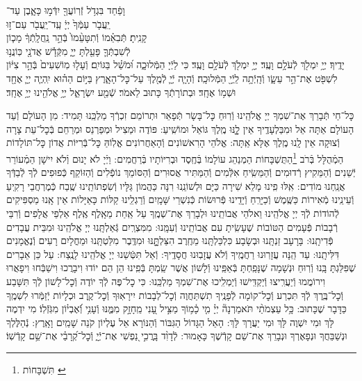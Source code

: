 \documentclass[twoside, openany, parskip=half, 11pt]{book}
\begin{document}
וָפַ֔חַד \hfill בִּגְדֹ֥ל זְֿרֽוֹעֲךָ֖ יִדְּֿמ֣וּ כָּאָ֑בֶן \hfill עַד־\\
יַֽעֲבֹ֤ר עַמְּֿךָ֙ יְיָ֔ \hfill עַֽד־יַֽעֲבֹ֖ר עַם־ז֣וּ \\
קָנִֽיתָ׃ \hfill תְּֿבִאֵ֗מוֹ וְֿתִטָּעֵ֨מוֹ֙ בְּֿהַ֣ר נַֽחֲלָֽתְֿךָ֔ \hfill מָכ֧וֹן \\
לְֿשִׁבְתְּֿךָ֛ פָּעַ֖לְתָּ יְיָ֑ \hfill מִקְּֿדָ֕שׁ אֲדֹנָ֖י כּֽוֹנֲנ֥וּ \\
יָדֶֽיךָ׃ \hfill יְיָ֥ יִמְלֹ֖ךְ לְֿעֹלָ֥ם וָעֶֽד׃\hfill \break
יְיָ֥ יִמְלֹ֖ךְ לְֿעֹלָ֥ם וָעֶֽד׃
כִּי לַיְֿיָ הַמְּֿלוּכָ֑ה וּ֝מֹשֵׁ֗ל בַּגּוֹיִֽם׃
וְֿעָל֤וּ מֽוֹשִׁעִים֙ בְּֿהַ֣ר צִיּ֔וֹן לִשְׁפֹּ֖ט אֶת־הַ֣ר עֵשָׂ֑ו וְֿהָֽיְֿתָ֥ה לַֽיְֿיָ֖ הַמְּֿלוּכָֽה׃
וְֿהָיָ֧ה יְֿיָ֛ לְֿמֶ֖לֶךְ עַל־כׇּל־הָאָ֑רֶץ בַּיּ֣וֹם הַה֗וּא יִֽהְיֶ֧ה יְיָ֛ אֶחָ֖ד וּשְׁמ֥וֹ אֶחָֽד׃
וּבְתוֹרָתְֿךָ כָּתוּב לֵאמֹר׃
שְֿׁמַ֖ע יִשְׂרָאֵ֑ל יְיָ֥ אֱלֹהֵ֖ינוּ יְיָ֥ אֶחָֽד׃

\enlargethispage{.5\baselineskip}
\label{nishmas}
כׇּל־חַי תְּֿבָרֵךְ אֶת־שִׁמְךָ יְיָ אֱלֹהֵֽינוּ וְֿרֽוּחַ כׇּל־בָּשָׂר תְּֿפָאֵר וּתְרוֹמֵם זִכְרְֿךָ מַלְכֵּֽנוּ תָּמִיד: מִן הָעוֹלָם וְֿעַד הָעוֹלָם אַתָּה אֵל וּמִבַּלְעָדֶֽיךָ אֵין לׇׇָֽנּוּ מֶֽלֶךְ גּוֹאֵל וּמוֹשִֽׁיעַ:
פּוֹדֶה וּמַצִיל וּמְפַרְנֵס וּמְרַחֵם בְּֿכׇל־עֵת צָרָה וְֿצוּקָה אֵין לָֽנוּ מֶֽלֶךְ אֶלָּא אַֽתָּה: אֱלֹהֵי הָרִאשׁוֹנִים וְֿהָאַחֲרוֹנִים אֱלֽוֹהַּ כׇּל־בְּֿרִיּוֹת אֲדוֹן כׇּל־תּוֹלָדוֹת הַמְֿהֻלָּל בְּֿרֹב \footnote{תִּשְׁבָּחוֹת \label{xx}}הַתֻּשְׁבָּחוֹת הַמְנַהֵג עוֹלָמוֹ בְּֿחֶֽסֶד וּבְרִיּוֹתָיו בְּֿרַחֲמִים: וַיְֿיָ לֹא יָנוּם וְֿלֹא יִישָׁן הַמְֿעוֹרֵר יְֿשֵׁנִים וְֿהַמֵּקִיץ רְֿדוּמִים וְֿהַמֵּשִֽׂיחַ אִלְּֿמִים וְֿהַמַּתִּיר אֲסוּרִים וְֿהַסּוֹמֵךְ נוֹפְֿלִים וְֿהַזּוֹקֵף כְּֿפוּפִים לְֿךָ לְֿבַדְּֿךָ אֲנַֽחְנוּ מוֹדִים: אִֽלּוּ פִֽינוּ מָלֵא שִׁירָה כַּיָּם וּלְשׁוֹנֵֽנוּ רִנָּה כַּהֲמוֹן גַּלָּיו וְֿשִׂפְתוֹתֵֽינוּ שֶֽׁבַח כְּֿמֶרְחֲבֵי רָקִֽיעַ וְֿעֵינֵֽינוּ מְֿאִירוֹת כַּשֶּֽׁמֶשׁ וְֿכַיָּרֵֽחַ וְֿיָדֵֽינוּ פְּֿרוּשׂוֹת כְּֿנִשְׁרֵי שָּׁמָֽיִם וְֿרַגְלֵֽינוּ קַלּוֹת כָּאַיָּלוֹת אֵין אָֽנוּ מַסְפִּיקִים לְֿהוֹדוֹת לְֿךָ יְיָ אֱלֹהֵֽינוּ וֵאלֹהֵי אֲבוֹתֵֽינוּ וּלְבָרֵךְ אֶת־שְׁמֶֽךָ עַל אַֽחַת מֵאָֽלֶף אֶֽלֶף אַלְפֵי אֲלָפִים וְֿרִבֵּי רְֿבָבוֹת פְּֿעָמִים הַטּוֹבוֹת שֶׁעָשִֽׂיתָ עִם אֲבוֹתֵֽינוּ וְֿעִמָּֽנוּ: מִמִּצְרַֽיִם גְּֿאַלְתָּֽנוּ יְיָ אֱלֹהֵֽינוּ וּמִבֵּית עֲבָדִים פְּֿדִיתָֽנוּ: בָּרָעָב זַנְתָּֽנוּ וּבְשָׂבָע כִּלְכַּלְתָּֽנוּ מֵחֶֽרֶב הִצַּלְתׇׇָּֽנּוּ וּמִדֶּֽבֶר מִלַּטְתָּֽנוּ וּמֵחֳלָיִם רָעִים וְֿנֶאֱמָנִים דִּלִּיתָֽנוּ: עַד הֵֽנָּה עֲזָרֽוּנוּ רַחֲמֶֽיךָ וְֿלֹא עֲזָבֽוּנוּ חֲסָדֶֽיךָ: וְֿאַל תִּטְּֿשֵׁנוּ יְיָ אֱלֹהֵֽינוּ לָנֶֽצַח: עַל כֵּן אֵבָרִים שֶׁפִּלַּגְתָּ בָּֽנוּ וְֿרֽוּחַ וּנְשָׁמָה שֶׁנָּפַֽחְתָּ בְּֿאַפֵּֽינוּ וְֿלָשׁוֹן אֲשֶׁר שַֽׂמְתָּ בְּֿפִֽינוּ הֵן הֵם יוֹדוּ וִיבָרֲכוּ וִישַׁבְּֿחוּ וִיפָאֲרוּ וִירוֹמֲמוּ וְֿיַעֲרִֽיצוּ וְֿיַקְדִּֽישׁוּ וְֿיַמְלִֽיכוּ אֶת־שִׁמְךָ מַלְכֵּֽנוּ: כִּי כׇל־פֶּה לְֿךָ יוֹדֶה וְֿכׇל־לָשׁוֹן לְֿךָ תִּשָּׁבַע וְֿכׇל־בֶּֽרֶךְ לְֿךָ תִּכְרַע וְֿכׇל־קוֹמָה לְֿפָנֶֽיךָ תִשְׁתַּחֲוֶה וְֿכׇל־לְבָבוֹת יִירָאֽוּךָ וְֿכׇל־קֶֽרֶב וּכְלָיוֹת יְֿזַמְּֿרוּ לִשְׁמֶֽךָ כַּדָּבָר שֶׁכָּתוּב:
כָּ֥ל עַצְמֹתַ֨י תֹּאמַרְנָה֘ יְיָ֗ מִ֤י כָ֫מ֥וֹךָ מַצִּ֣יל עָ֭נִי מֵֽחָזָ֣ק מִמֶּ֑נּוּ וְֿעָנִ֥י וְֿ֝אֶבְי֗וֹן מִגֹּֽזְֿלֽוֹ׃ מִי יִדְמֶה לָּךְ וּמִי יִשְׁוֶה לָּךְ וּמִי יַעֲרָךְ לָּךְ: הָאֵל הַגָּדוֹל הַגִּבּוֹר וְֿהַנּוֹרָא אֵל עֶלְיוֹן קֹנֵה שָׁמַֽיִם וָאָֽרֶץ:
נְֿהַלֶּלְךָ וּנְשַׁבֵּחֲךָ וּנְפָאֶרְךָ וּנְבָרֵךְ אֶת־שֵׁם קָדְֿשֶׁךָ כָּאָמוּר:
לְֿדָוִ֨ד בָּֽרֲכִ֣י נַ֭פְשִׁי אֶת־יְֿיָ֑ וְֿכׇל־קְ֝רָבַ֗י אֶת־שֵׁ֥ם קָדְֿשֽׁוֹ׃
\end{document}
